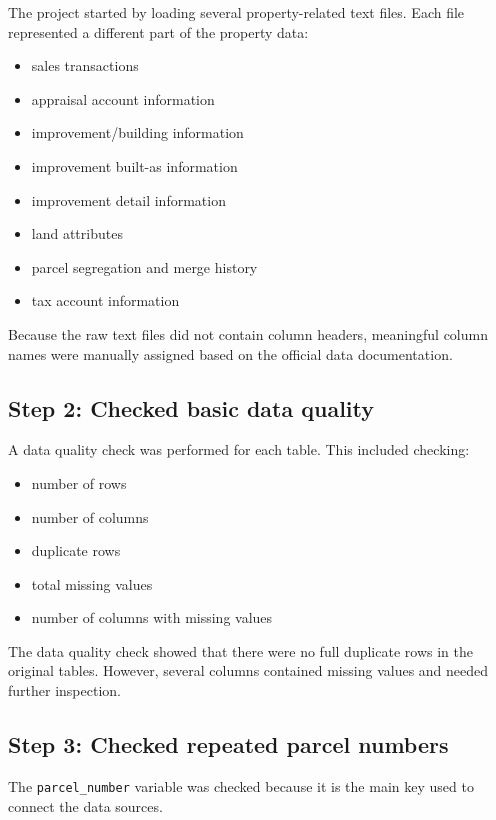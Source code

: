 \documentclass[
  english,
  letterpaper,
  DIV=11,
  numbers=noendperiod]{scrreprt}
\begin{document}
The project started by loading several property-related text files. Each
file represented a different part of the property data:

\begin{itemize}
\item
  sales transactions
\item
  appraisal account information
\item
  improvement/building information
\item
  improvement built-as information
\item
  improvement detail information
\item
  land attributes
\item
  parcel segregation and merge history
\item
  tax account information
\end{itemize}

Because the raw text files did not contain column headers, meaningful
column names were manually assigned based on the official data
documentation.

\subsection{Step 2: Checked basic data
quality}\label{step-2-checked-basic-data-quality}

A data quality check was performed for each table. This included
checking:

\begin{itemize}
\item
  number of rows
\item
  number of columns
\item
  duplicate rows
\item
  total missing values
\item
  number of columns with missing values
\end{itemize}

The data quality check showed that there were no full duplicate rows in
the original tables. However, several columns contained missing values
and needed further inspection.

\subsection{Step 3: Checked repeated parcel
numbers}\label{step-3-checked-repeated-parcel-numbers}

The \texttt{parcel\_number} variable was checked because it is the main
key used to connect the data sources.
\end{document}
